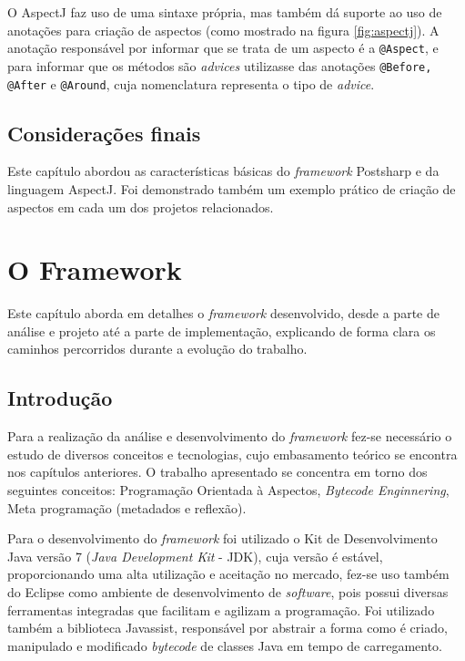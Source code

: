 \documentclass[tc,oneside]{iiufrgs}
\begin{document}
O AspectJ faz uso de uma sintaxe própria, mas também dá suporte ao uso de anotações para criação de aspectos (como mostrado na figura \ref{fig:aspectj}). A anotação responsável por informar que se trata de um aspecto é a \texttt{@Aspect}, e para informar que os métodos são \textit{advices} utilizasse das anotações \texttt{@Before, @After} e \texttt{@Around}, cuja nomenclatura representa o tipo de \textit{advice}.

\section{Considerações finais}

Este capítulo abordou as características básicas do \textit{framework} Postsharp e da linguagem AspectJ. Foi demonstrado também um exemplo prático de criação de aspectos em cada um dos projetos relacionados.

\chapter{O Framework}
\label{cap7}

Este capítulo aborda em detalhes o \textit{framework} desenvolvido, desde a parte de análise  e projeto até a parte de implementação, explicando de forma clara os caminhos percorridos durante a evolução do trabalho.

\section{Introdução}

Para a realização da análise e desenvolvimento do \textit{framework} fez-se necessário o estudo de diversos conceitos e tecnologias,  cujo embasamento teórico se encontra nos capítulos anteriores. O trabalho apresentado se concentra em torno dos seguintes conceitos: Programação Orientada à Aspectos, \textit{Bytecode Enginnering}, Meta programação (metadados e reflexão).

Para o desenvolvimento do \textit{framework} foi utilizado o Kit de Desenvolvimento Java versão 7 (\textit{Java Development Kit} - JDK), cuja versão é estável, proporcionando uma alta utilização e aceitação no mercado, fez-se uso também do Eclipse como ambiente de desenvolvimento de \textit{software}, pois possui diversas ferramentas integradas que facilitam e agilizam a programação. Foi utilizado também a biblioteca Javassist, responsável por abstrair a forma como é criado, manipulado e modificado \textit{bytecode} de classes Java em tempo de carregamento. 
\end{document}
